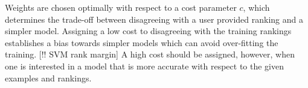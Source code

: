 Weights are chosen optimally with respect to a cost parameter $c$, which determines the trade-off between disagreeing with a user provided ranking and a simpler model. Assigning a low cost to disagreeing with the training rankings establishes a bias towards simpler models which can avoid over-fitting the training. [!! SVM rank margin] A high cost should be assigned, however, when one is interested in a model that is more accurate with respect to the given examples and rankings.